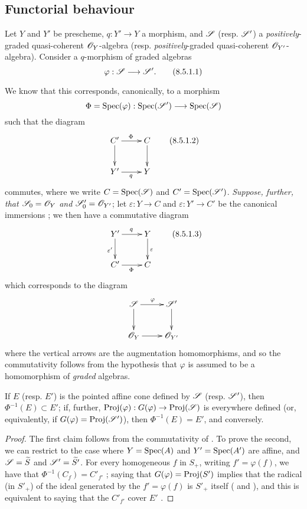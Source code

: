 \subsection{Functorial behaviour}
\label{subsection:II.8.5}

\begin{env}[8.5.1]
\label{II.8.5.1}
Let $Y$ and $Y'$ be prescheme, $q:Y'\to Y$ a morphism, and $\mathscr{S}$ (resp. $\mathscr{S}'$) a \emph{positively}-graded quasi-coherent $\mathscr{O}_Y$-algebra (resp. \emph{positively}-graded quasi-coherent $\mathscr{O}_{Y'}$-algebra).
Consider a $q$-morphism of graded algebras
\[
\label{eq:2.8.5.1.1}
  \varphi: \sh{S} \to \sh{S}'.
\tag{8.5.1.1}
\]

We know  that this corresponds, canonically, to a morphism
\[
  \Phi = \Spec(\varphi): \Spec(\sh{S}') \to \Spec(\sh{S})
\]
such that the diagram
\[
\label{eq:2.8.5.1.2}
  \xymatrix{
    C'
      \ar[r]^{\Phi}
      \ar[d]
  & C
      \ar[d]
  \\Y'
      \ar[r]_{q}
  & Y
  }
\tag{8.5.1.2}
\]
commutes, where we write $C=\operatorname{Spec}(\mathscr{S})$ and $C'=\operatorname{Spec}(\mathscr{S}')$.
\emph{Suppose, further, that $\mathscr{S}_0=\mathscr{O}_Y$ and $\mathscr{S}'_0=\mathscr{O}_{Y'}$};
let $\varepsilon:Y\to C$ and $\varepsilon:Y'\to C'$ be the canonical immersions ;
we then have a commutative diagram
\[
\label{eq:2.8.5.1.3}
  \xymatrix{
    Y'
      \ar[r]^{q}
      \ar[d]_{\varepsilon'}
  & Y
      \ar[d]^{\varepsilon}
  \\C'
      \ar[r]_{\Phi}
  & C
  }
\tag{8.5.1.3}
\]
which corresponds to the diagram
\[
  \xymatrix{
    \sh{S}
      \ar[r]^{\varphi}
      \ar[d]
  & \sh{S}'
      \ar[d]
  \\\sh{O}_Y
      \ar[r]
  & \sh{O}_{Y'}
  }
\]
where the vertical arrows are the augmentation homomorphisms, and so the commutativity follows from the hypothesis that $\varphi$ is assumed to be a homomorphism of \emph{graded} algebras.
\end{env}

\begin{proposition}[8.5.2]
\label{II.8.5.2}
If $E$ (resp. $E'$) is the pointed affine cone defined by $\mathscr{S}$ (resp. $\mathscr{S}'$), then $\Phi^{-1}(E)\subset E'$;
if, further, $\Proj(\varphi):G(\varphi)\to\Proj(\sh{S})$ is everywhere defined (or, equivalently, if $G(\varphi)=\operatorname{Proj}(\mathscr{S}')$), then $\Phi^{-1}(E)=E'$, and conversely.
\end{proposition}

\begin{proof}
The first claim follows from the commutativity of .
To prove the second, we can restrict to the case where $Y=\operatorname{Spec}(A)$ and $Y'=\operatorname{Spec}(A')$ are affine, and $\mathscr{S}=\widetilde{S}$ and $\mathscr{S}'=\widetilde{S'}$.
For every homogeneous $f$ in $S_+$, writing $f'=\varphi(f)$, we have that $\Phi^{-1}(C_f)=C'_{f'}$ ;
saying that $G(\varphi)=\operatorname{Proj}(S')$ implies that the radical (in $S'_+$) of the ideal generated by the $f'=\varphi(f)$ is $S'_+$ itself ( and ), and this is equivalent to saying that the $C'_{f'}$ cover $E'$ .
\end{proof}

